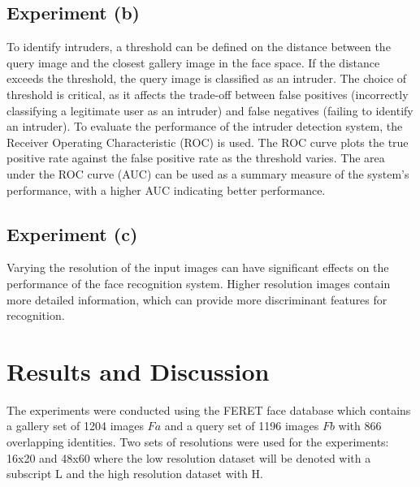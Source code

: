 \documentclass[12pt, letterpaper]{article}
\begin{document}
\subsection{Experiment (b)}

To identify intruders, a threshold can be defined on the distance between the query image and
the closest gallery image in the face space. If the distance exceeds the threshold, the query
image is classified as an intruder. The choice of threshold is critical, as it affects the
trade-off between false positives (incorrectly classifying a legitimate user as an intruder)
and false negatives (failing to identify an intruder). To evaluate the performance of the
intruder detection system, the Receiver Operating Characteristic (ROC) is used. The ROC curve
plots the true positive rate against the false positive rate as the threshold varies. The area
under the ROC curve (AUC) can be used as a summary measure of the system's performance, with
a higher AUC indicating better performance.

\subsection{Experiment (c)}

Varying the resolution of the input images can have significant effects on the performance
of the face recognition system. Higher resolution images contain more detailed information,
which can provide more discriminant features for recognition.

\section{Results and Discussion}
\label{sec:results}


The experiments were conducted using the FERET face database which contains a gallery set of
1204 images $Fa$ and a query set of 1196 images $Fb$ with 866 overlapping identities. Two sets of
resolutions were used for the experiments: 16x20 and 48x60 where the low resolution dataset will
be denoted with a subscript L and the high resolution dataset with H.
\end{document}

